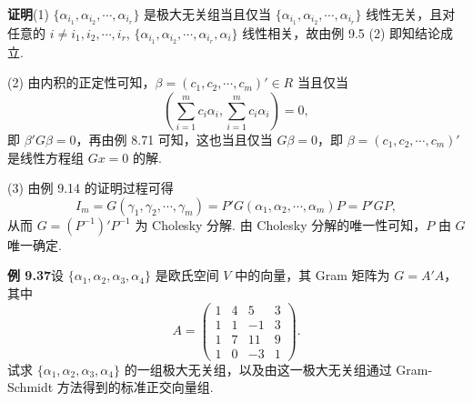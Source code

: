 \documentclass[UTF8,12pt,a4paper,fontset=fandol]{ctexart}
\begin{document}
\noindent\textbf{证明}\quad (1) $\{\alpha_{i_1},\alpha_{i_2},\cdots,\alpha_{i_r}\}$ 是极大无关组当且仅当 $\{\alpha_{i_1},\alpha_{i_2},\cdots,\alpha_{i_r}\}$ 线性无关，且对任意的 $i\ne i_1,i_2,\cdots,i_r$, $\{\alpha_{i_1},\alpha_{i_2},\cdots,\alpha_{i_r},\alpha_i\}$ 线性相关，故由例 9.5 (2) 即知结论成立.

(2) 由内积的正定性可知，$\beta=(c_1,c_2,\cdots,c_m)'\in R$ 当且仅当
\[
\left(\sum_{i=1}^m c_i\alpha_i,\sum_{i=1}^m c_i\alpha_i\right)=0,
\]
即 $\beta'G\beta=0$，再由例 8.71 可知，这也当且仅当 $G\beta=0$，即 $\beta=(c_1,c_2,\cdots,c_m)'$ 是线性方程组 $Gx=0$ 的解.

(3) 由例 9.14 的证明过程可得
\[
I_m=G(\gamma_1,\gamma_2,\cdots,\gamma_m)=P'G(\alpha_1,\alpha_2,\cdots,\alpha_m)P=P'GP,
\]
从而 $G=(P^{-1})'P^{-1}$ 为 Cholesky 分解. 由 Cholesky 分解的唯一性可知，$P$ 由 $G$ 唯一确定.

\noindent\textbf{例 9.37}\quad 设 $\{\alpha_1,\alpha_2,\alpha_3,\alpha_4\}$ 是欧氏空间 $V$ 中的向量，其 Gram 矩阵为 $G=A'A$，其中
\[
A=
\begin{pmatrix}
1&4&5&3\\
1&1&-1&3\\
1&7&11&9\\
1&0&-3&1
\end{pmatrix}.
\]
试求 $\{\alpha_1,\alpha_2,\alpha_3,\alpha_4\}$ 的一组极大无关组，以及由这一极大无关组通过 Gram-Schmidt 方法得到的标准正交向量组.
\end{document}

